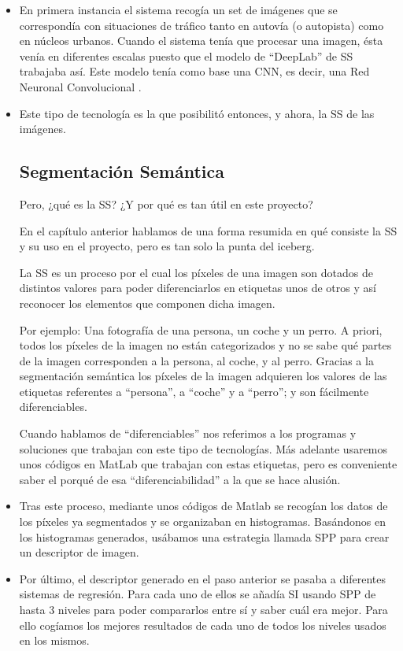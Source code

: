 \begin{itemize}
\item En primera instancia el sistema recogía un set de imágenes que se correspondía con situaciones de tráfico tanto en autovía (o autopista) como en núcleos urbanos. Cuando el sistema tenía que procesar una imagen, ésta venía en diferentes escalas puesto que el modelo de ``DeepLab'' de \ac{SS} trabajaba así. Este modelo tenía como base una \ac{CNN}, es decir, una Red Neuronal Convolucional \cite{cnn}.
 
\item Este tipo de tecnología es la que posibilitó entonces, y ahora, la \ac{SS} de las imágenes.

\subsection{Segmentación Semántica}

Pero, ¿qué es la \ac{SS}? ¿Y por qué es tan útil en este proyecto?


En el capítulo anterior hablamos de una forma resumida en qué consiste la \ac{SS} y su uso en el proyecto, pero es tan solo la punta del iceberg.


La \ac{SS} es un proceso por el cual los píxeles de una imagen son dotados de distintos valores para poder diferenciarlos en etiquetas unos de otros y así reconocer los elementos que componen dicha imagen. 


Por ejemplo: Una fotografía de una persona, un coche y un perro. A priori, todos los píxeles de la imagen no están categorizados y no se sabe qué partes de la imagen corresponden a la persona, al coche, y al perro. Gracias a la segmentación semántica los píxeles de la imagen adquieren los valores de las etiquetas referentes a ``persona'', a ``coche'' y a ``perro''; y son fácilmente diferenciables.

Cuando hablamos de ``diferenciables'' nos referimos a los programas y soluciones que trabajan con este tipo de tecnologías. Más adelante usaremos unos códigos en MatLab que trabajan con estas etiquetas, pero es conveniente saber el porqué de esa ``diferenciabilidad'' a la que se hace alusión.

\item Tras este proceso, mediante unos códigos de Matlab se recogían los datos de los píxeles ya segmentados y se organizaban en histogramas. Basándonos en los histogramas generados, usábamos una estrategia llamada \ac{SPP} \cite{spp} para crear un descriptor de imagen.

\item Por último, el descriptor generado en el paso anterior se pasaba a diferentes sistemas de regresión. Para cada uno de ellos se añadía \ac{SI} \cite{spp} usando \ac{SPP} de hasta 3 niveles para poder compararlos entre sí y saber cuál era mejor. Para ello cogíamos los mejores resultados de cada uno de todos los niveles usados en los mismos.

\end{itemize}


